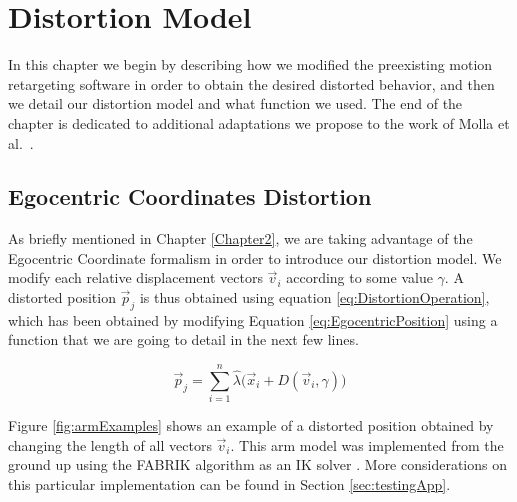 
\chapter{Distortion Model} %

\label{Chapter3} %

In this chapter we begin by describing how we modified the preexisting motion retargeting software in order to obtain the desired distorted behavior, and then we detail our distortion model and what function we used. The end of the chapter is dedicated to additional adaptations we propose to the work of Molla et al.\ \cite{molla2017egocentric}.

\section{Egocentric Coordinates Distortion}

As briefly mentioned in Chapter \ref{Chapter2}, we are taking advantage of the Egocentric Coordinate formalism in order to introduce our distortion model. We modify each relative displacement vectors $\vec{v}_i$ according to some value $\gamma$. A distorted position $\vec{p}_j$ is thus obtained using equation \ref{eq:DistortionOperation}, which has been obtained by modifying Equation \ref{eq:EgocentricPosition} using a function that we are going to detail in the next few lines.

\begin{equation}
\label{eq:DistortionOperation}
\vec{p}_j = \displaystyle\sum_{i=1}^{n} \hat{\lambda}\big(\vec{x}_i + D(\vec{v}_i,\gamma )\big)
\end{equation}

Figure \ref{fig:armExamples} shows an example of a distorted position obtained by changing the length of all vectors $\vec{v}_i$. This arm model was implemented from the ground up using the FABRIK algorithm as an IK solver \cite{aristidou2011fabrik}. More considerations on this particular implementation can be found in Section \ref{sec:testingApp}.

